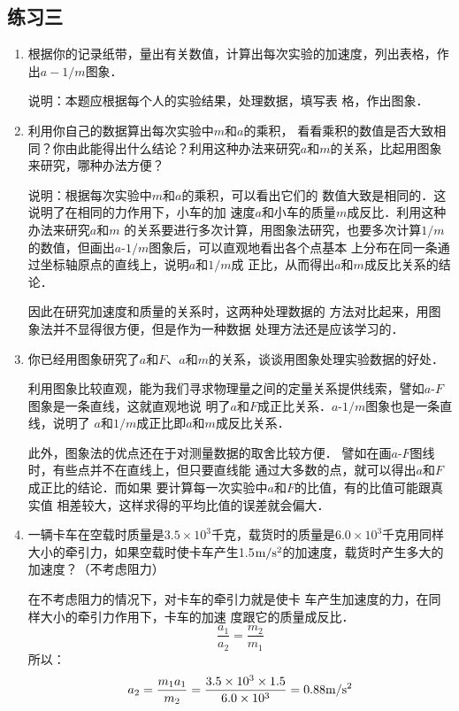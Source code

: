 \subsection{练习三}
\begin{enumerate}
	\item 根据你的记录纸带，量出有关数值，计算出每次实验的加速度，列出表格，作出$a-1/m$图象．
	 
    \begin{solution}
        说明：本题应根据每个人的实验结果，处理数据，填写表
格，作出图象．
    \end{solution}
\item 利用你自己的数据算出每次实验中$m$和$a$的乘积，
看看乘积的数值是否大致相同？你由此能得出什么结论？利用这种办法来研究$a$和$m$的关系，比起用图象来研究，哪种办法方便？
	 
\begin{solution}
    说明：根据每次实验中$m$和$a$的乘积，可以看出它们的
数值大致是相同的．这说明了在相同的力作用下，小车的加
速度$a$和小车的质量$m$成反比．利用这种办法来研究$a$和$m$
的关系要进行多次计算，用图象法研究，也要多次计算$1/m$
的数值，但画出$a$-$1/m$图象后，可以直观地看出各个点基本
上分布在同一条通过坐标轴原点的直线上，说明$a$和$1/m$成
正比，从而得出$a$和$m$成反比关系的结论．

因此在研究加速度和质量的关系时，这两种处理数据的
方法对比起来，用图象法并不显得很方便，但是作为一种数据
处理方法还是应该学习的．
\end{solution}
\item 你已经用图象研究了$a$和$F$、$a$和$m$的关系，谈谈用图象处理实验数据的好处．
	 
\begin{solution}
利用图象比较直观，能为我们寻求物理量之间的定量关系提供线索，譬如$a$-$F$图象是一条直线，这就直观地说
    明了$a$和$F$成正比关系．$a$-$1/m$图象也是一条直线，说明了
    $a$和$1/m$成正比即$a$和$m$成反比关系．

    此外，图象法的优点还在于对测量数据的取舍比较方便．
    譬如在画$a$-$F$图线时，有些点并不在直线上，但只要直线能
    通过大多数的点，就可以得出$a$和$F$成正比的结论．而如果
    要计算每一次实验中$a$和$F$的比值，有的比值可能跟真实值
    相差较大，这样求得的平均比值的误差就会偏大．    
\end{solution}
\item 一辆卡车在空载时质量是$3.5\times 10^3$千克，载货时的质量是$6.0\times 10^3$千克用同样大小的牵引力，如果空载时使卡车产生1.5$\text{m}/\text{s}^2$的加速度，载货时产生多大的加速度？（不考虑阻力）
	 
\begin{solution}
    在不考虑阻力的情况下，对卡车的牵引力就是使卡
车产生加速度的力，在同样大小的牵引力作用下，卡车的加速
度跟它的质量成反比．
\[\frac{a_1}{a_2}=\frac{m_2}{m_1}\]
所以：
\[a_2=\frac{m_1a_1}{m_2}=\frac{3.5\times 10^3\times 1.5}{6.0\times 10^3}=0.88\text{m}/\text{s}^2\]
\end{solution}
\end{enumerate}



